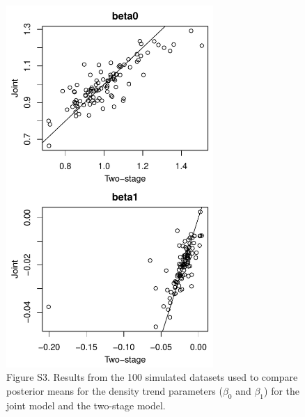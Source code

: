 \documentclass[12pt]{article}
\begin{document}
\begin{figure}[h!]
  \centering
  \includegraphics[width=0.7\textwidth]{sim/sim-betas}
  \caption{Figure S3. Results from the 100 simulated datasets used to
    compare posterior means for the density trend parameters
    ($\beta_0$ and $\beta_1$) for the joint model and 
    the two-stage model. }  
  \label{fig:sim-betas}
\end{figure}


\clearpage
\end{document}
